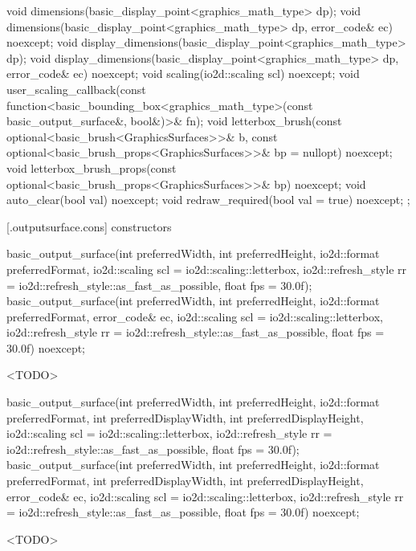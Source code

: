 \begin{codeblock}
{{    void dimensions(basic_display_point<graphics_math_type> dp);
    void dimensions(basic_display_point<graphics_math_type> dp, error_code& ec) noexcept;
    void display_dimensions(basic_display_point<graphics_math_type> dp);
    void display_dimensions(basic_display_point<graphics_math_type> dp, error_code& ec) noexcept;
    void scaling(io2d::scaling scl) noexcept;
    void user_scaling_callback(const
      function<basic_bounding_box<graphics_math_type>(const basic_output_surface&, bool&)>& fn);
    void letterbox_brush(const optional<basic_brush<GraphicsSurfaces>>& b,
      const optional<basic_brush_props<GraphicsSurfaces>>& bp = nullopt) noexcept;
    void letterbox_brush_props(const optional<basic_brush_props<GraphicsSurfaces>>& bp) noexcept;
    void auto_clear(bool val) noexcept;
    void redraw_required(bool val = true) noexcept;
  };
}
\end{codeblock}

 [\iotwod.outputsurface.cons] { constructors}

%
\begin{itemdecl}
basic_output_surface(int preferredWidth, int preferredHeight, io2d::format preferredFormat,
  io2d::scaling scl = io2d::scaling::letterbox,
  io2d::refresh_style rr = io2d::refresh_style::as_fast_as_possible, float fps = 30.0f);
basic_output_surface(int preferredWidth, int preferredHeight, io2d::format preferredFormat,
  error_code& ec, io2d::scaling scl = io2d::scaling::letterbox,
  io2d::refresh_style rr = io2d::refresh_style::as_fast_as_possible, float fps = 30.0f)
  noexcept;
\end{itemdecl}
\begin{itemdescr}
\pnum
<TODO>
\end{itemdescr}

%
\begin{itemdecl}
basic_output_surface(int preferredWidth, int preferredHeight, io2d::format preferredFormat,
  int preferredDisplayWidth, int preferredDisplayHeight,
  io2d::scaling scl = io2d::scaling::letterbox,
  io2d::refresh_style rr = io2d::refresh_style::as_fast_as_possible, float fps = 30.0f);
basic_output_surface(int preferredWidth, int preferredHeight,
  io2d::format preferredFormat, int preferredDisplayWidth, int preferredDisplayHeight,
  error_code& ec, io2d::scaling scl = io2d::scaling::letterbox,
  io2d::refresh_style rr = io2d::refresh_style::as_fast_as_possible, float fps = 30.0f)
  noexcept;
\end{itemdecl}
\begin{itemdescr}
\pnum
<TODO>
\end{itemdescr}

